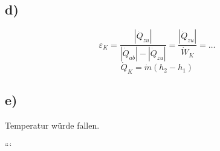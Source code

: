 \subsection*{d)}
\[
\varepsilon_K = \frac{|\dot{Q}_{zu}|}{|\dot{Q}_{ab}| - |\dot{Q}_{zu}|} = \frac{|\dot{Q}_{zu}|}{\dot{W}_K} = \ldots
\]
\[
\dot{Q}_K = \dot{m}(h_2 - h_1)
\]

\subsection*{e)}
Temperatur würde fallen.

```